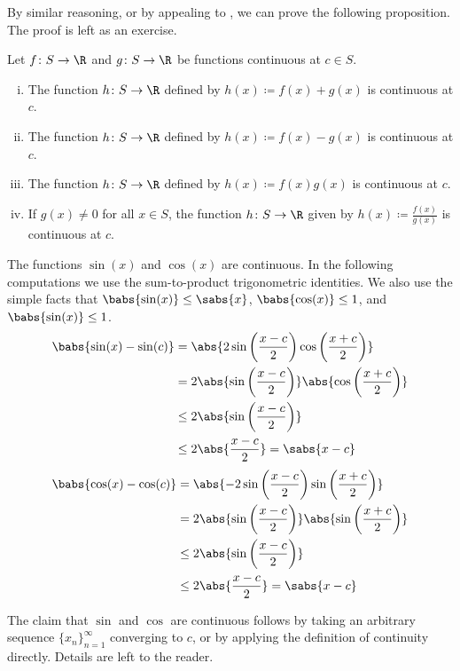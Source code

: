 By similar reasoning, or by appealing to ,
we can prove the following proposition.  The proof is left as an
exercise.

\begin{prop} \label{contalg:prop}
Let $f \colon S \to \R$ and $g \colon S \to \R$ be functions
continuous at $c \in S$.
\begin{enumerate}[(i)]
\item The function $h \colon S \to \R$ defined by
$h(x) \coloneqq f(x)+g(x)$ is continuous at $c$.
\item The function $h \colon S \to \R$ defined by
$h(x) \coloneqq f(x)-g(x)$ is continuous at $c$.
\item The function $h \colon S \to \R$ defined by
$h(x) \coloneqq f(x)g(x)$ is continuous at $c$.
\item If $g(x)\not=0$ for all $x \in S$, the function $h \colon S \to \R$
given by $h(x) \coloneqq \frac{f(x)}{g(x)}$ is continuous at $c$.
\end{enumerate}
\end{prop}

\begin{example} \label{sincos:example}
The functions $\sin(x)$ and $\cos(x)$ are continuous.
In the following computations we use the sum-to-product
trigonometric identities.  We also use the simple facts that
$\babs{\sin(x)} \leq \sabs{x}$, $\babs{\cos(x)} \leq 1$,
and $\babs{\sin(x)} \leq 1$.
\begin{equation*}
\begin{split}
\babs{\sin(x)-\sin(c)} & =
\abs{
2 \sin \left( \frac{x-c}{2} \right) \cos \left( \frac{x+c}{2} \right)
}
\\
& =
2
\abs{ \sin \left( \frac{x-c}{2} \right) }
\abs{ \cos \left( \frac{x+c}{2} \right) }
\\
& \leq
2
\abs{ \sin \left( \frac{x-c}{2} \right) }
\\
& \leq
2
\abs{ \frac{x-c}{2} }
= \sabs{x-c}
\end{split}
\end{equation*}
\begin{equation*}
\begin{split}
\babs{\cos(x)-\cos(c)} & =
\abs{
-2 \sin \left( \frac{x-c}{2} \right) \sin \left( \frac{x+c}{2} \right)
}
\\
& =
2
\abs{ \sin \left( \frac{x-c}{2} \right) }
\abs{ \sin \left( \frac{x+c}{2} \right) }
\\
& \leq
2
\abs{ \sin \left( \frac{x-c}{2} \right) }
\\
& \leq
2
\abs{ \frac{x-c}{2} }
= \sabs{x-c}
\end{split}
\end{equation*}

The claim that $\sin$ and $\cos$ are continuous follows by taking an
arbitrary sequence $\{ x_n \}_{n=1}^\infty$ converging to $c$, or by applying the
definition of continuity directly.  Details are left to the
reader.
\end{example}

